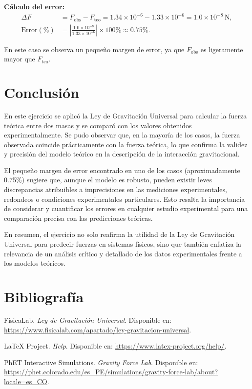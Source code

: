 \documentclass[a4paper,12pt]{article}
\begin{document}
\textbf{Cálculo del error:}
\begin{align*}
\Delta F &= F_{\text{obs}} - F_{\text{teo}} = 1.34 \times 10^{-6} - 1.33 \times 10^{-6} = 1.0 \times 10^{-8}\,\text{N}, \\
\text{Error}(\%) &= \left|\frac{1.0 \times 10^{-8}}{1.33 \times 10^{-6}}\right| \times 100\% \approx 0.75\%.
\end{align*}

En este caso se observa un pequeño margen de error, ya que \(F_{\text{obs}}\) es ligeramente mayor que \(F_{\text{teo}}\).


\newpage
\section*{Conclusión}

En este ejercicio se aplicó la Ley de Gravitación Universal para calcular la fuerza teórica entre dos masas y se comparó con los valores obtenidos experimentalmente. Se pudo observar que, en la mayoría de los casos, la fuerza observada coincide prácticamente con la fuerza teórica, lo que confirma la validez y precisión del modelo teórico en la descripción de la interacción gravitacional.

El pequeño margen de error encontrado en uno de los casos (aproximadamente 0.75\%) sugiere que, aunque el modelo es robusto, pueden existir leves discrepancias atribuibles a imprecisiones en las mediciones experimentales, redondeos o condiciones experimentales particulares. Esto resalta la importancia de considerar y cuantificar los errores en cualquier estudio experimental para una comparación precisa con las predicciones teóricas.

En resumen, el ejercicio no solo reafirma la utilidad de la Ley de Gravitación Universal para predecir fuerzas en sistemas físicos, sino que también enfatiza la relevancia de un análisis crítico y detallado de los datos experimentales frente a los modelos teóricos.

\newpage
\section*{Bibliografía}
\begin{thebibliography}{9}
    FísicaLab. \textit{Ley de Gravitación Universal}. Disponible en: \url{https://www.fisicalab.com/apartado/ley-gravitacion-universal}.
    
    LaTeX Project. \textit{Help}. Disponible en: \url{https://www.latex-project.org/help/}.
    
    PhET Interactive Simulations. \textit{Gravity Force Lab}. Disponible en: \url{https://phet.colorado.edu/es_PE/simulations/gravity-force-lab/about?locale=es_CO}.
\end{thebibliography}
\end{document}
